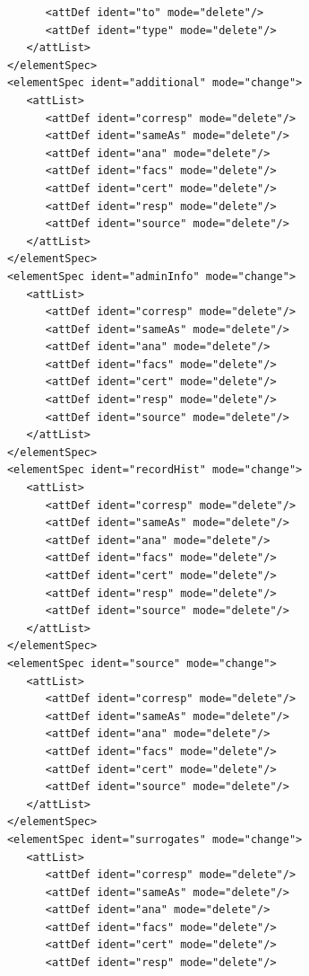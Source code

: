 \documentclass[a4paper,12pt,twoside]{book}
\begin{document}
\begin{verbatim}
                  <attDef ident="to" mode="delete"/>
                  <attDef ident="type" mode="delete"/>
               </attList>
            </elementSpec>
            <elementSpec ident="additional" mode="change">
               <attList>
                  <attDef ident="corresp" mode="delete"/>
                  <attDef ident="sameAs" mode="delete"/>
                  <attDef ident="ana" mode="delete"/>
                  <attDef ident="facs" mode="delete"/>
                  <attDef ident="cert" mode="delete"/>
                  <attDef ident="resp" mode="delete"/>
                  <attDef ident="source" mode="delete"/>
               </attList>
            </elementSpec>
            <elementSpec ident="adminInfo" mode="change">
               <attList>
                  <attDef ident="corresp" mode="delete"/>
                  <attDef ident="sameAs" mode="delete"/>
                  <attDef ident="ana" mode="delete"/>
                  <attDef ident="facs" mode="delete"/>
                  <attDef ident="cert" mode="delete"/>
                  <attDef ident="resp" mode="delete"/>
                  <attDef ident="source" mode="delete"/>
               </attList>
            </elementSpec>
            <elementSpec ident="recordHist" mode="change">
               <attList>
                  <attDef ident="corresp" mode="delete"/>
                  <attDef ident="sameAs" mode="delete"/>
                  <attDef ident="ana" mode="delete"/>
                  <attDef ident="facs" mode="delete"/>
                  <attDef ident="cert" mode="delete"/>
                  <attDef ident="resp" mode="delete"/>
                  <attDef ident="source" mode="delete"/>
               </attList>
            </elementSpec>
            <elementSpec ident="source" mode="change">
               <attList>
                  <attDef ident="corresp" mode="delete"/>
                  <attDef ident="sameAs" mode="delete"/>
                  <attDef ident="ana" mode="delete"/>
                  <attDef ident="facs" mode="delete"/>
                  <attDef ident="cert" mode="delete"/>
                  <attDef ident="source" mode="delete"/>
               </attList>
            </elementSpec>
            <elementSpec ident="surrogates" mode="change">
               <attList>
                  <attDef ident="corresp" mode="delete"/>
                  <attDef ident="sameAs" mode="delete"/>
                  <attDef ident="ana" mode="delete"/>
                  <attDef ident="facs" mode="delete"/>
                  <attDef ident="cert" mode="delete"/>
                  <attDef ident="resp" mode="delete"/>

\end{verbatim}
\end{document}
